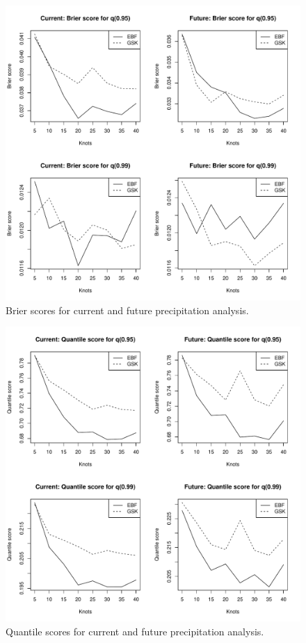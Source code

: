 \documentclass[11pt]{article}
\begin{document}
\begin{figure}  %
  \centering
  \includegraphics[width=\linewidth]{plots/precip-bs.pdf}
  \caption{Brier scores for current and future precipitation analysis.}
  \label{ebfig:precip-bs}
\end{figure}

\begin{figure}  %
  \centering
  \includegraphics[width=\linewidth]{plots/precip-qs.pdf}
  \caption{Quantile scores for current and future precipitation analysis.}
  \label{ebfig:precip-qs}
\end{figure}
\end{document}
